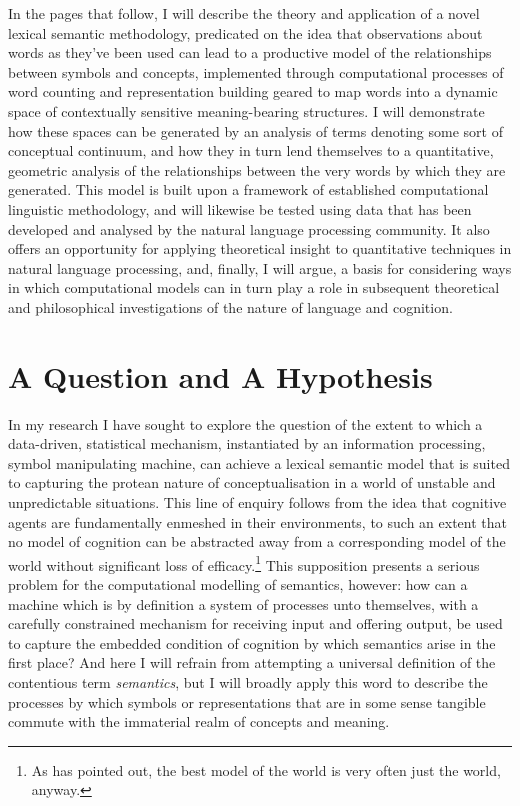 In the pages that follow, I will describe the theory and application of a novel lexical semantic methodology, predicated on the idea that observations about words as they've been used can lead to a productive model of the relationships between symbols and concepts, implemented through computational processes of word counting and representation building geared to map words into a dynamic space of contextually sensitive meaning-bearing structures.  I will demonstrate how these spaces can be generated by an analysis of terms denoting some sort of conceptual continuum, and how they in turn lend themselves to a quantitative, geometric analysis of the relationships between the very words by which they are generated.  This model is built upon a framework of established computational linguistic methodology, and will likewise be tested using data that has been developed and analysed by the natural language processing community.  It also offers an opportunity for applying theoretical insight to quantitative techniques in natural language processing, and, finally, I will argue, a basis for considering ways in which computational models can in turn play a role in subsequent theoretical and philosophical investigations of the nature of language and cognition.

\section{A Question and A Hypothesis}
In my research I have sought to explore the question of the extent to which a data-driven, statistical mechanism, instantiated by an information processing, symbol manipulating machine, can achieve a lexical semantic model that is suited to capturing the protean nature of conceptualisation in a world of unstable and unpredictable situations.  This line of enquiry follows from the idea that cognitive agents are fundamentally enmeshed in their environments, to such an extent that no model of cognition can be abstracted away from a corresponding model of the world without significant loss of efficacy.\footnote{As \cite{Brooks1991} has pointed out, the best model of the world is very often just the world, anyway.}  This supposition presents a serious problem for the computational modelling of semantics, however: how can a machine which is by definition a system of processes unto themselves, with a carefully constrained mechanism for receiving input and offering output, be used to capture the embedded condition of cognition by which semantics arise in the first place?  And here I will refrain from attempting a universal definition of the contentious term \emph{semantics}, but I will broadly apply this word to describe the processes by which symbols or representations that are in some sense tangible commute with the immaterial realm of concepts and meaning.

